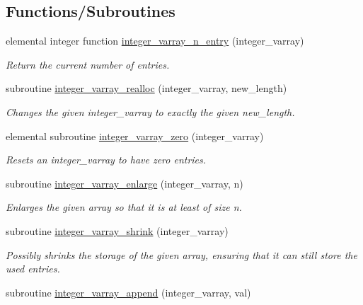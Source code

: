 \subsection*{Functions/\+Subroutines}
\begin{DoxyCompactItemize}
\item 
elemental integer function \mbox{\hyperlink{namespacepmc__integer__varray_aac024cead9772e37f130bdc79254cdd5}{integer\+\_\+varray\+\_\+n\+\_\+entry}} (integer\+\_\+varray)
\begin{DoxyCompactList}\small\item\em Return the current number of entries. \end{DoxyCompactList}\item 
subroutine \mbox{\hyperlink{namespacepmc__integer__varray_a56e39f9ee34a4092a5c32b74b85494bc}{integer\+\_\+varray\+\_\+realloc}} (integer\+\_\+varray, new\+\_\+length)
\begin{DoxyCompactList}\small\item\em Changes the given integer\+\_\+varray to exactly the given new\+\_\+length. \end{DoxyCompactList}\item 
elemental subroutine \mbox{\hyperlink{namespacepmc__integer__varray_a374e54ec508c92316da539cb8f0d8a0f}{integer\+\_\+varray\+\_\+zero}} (integer\+\_\+varray)
\begin{DoxyCompactList}\small\item\em Resets an integer\+\_\+varray to have zero entries. \end{DoxyCompactList}\item 
subroutine \mbox{\hyperlink{namespacepmc__integer__varray_af17a55e72739f42ea30171ba6b236309}{integer\+\_\+varray\+\_\+enlarge}} (integer\+\_\+varray, n)
\begin{DoxyCompactList}\small\item\em Enlarges the given array so that it is at least of size n. \end{DoxyCompactList}\item 
subroutine \mbox{\hyperlink{namespacepmc__integer__varray_a8c78aecfc2429aeca30d230222f69a1e}{integer\+\_\+varray\+\_\+shrink}} (integer\+\_\+varray)
\begin{DoxyCompactList}\small\item\em Possibly shrinks the storage of the given array, ensuring that it can still store the used entries. \end{DoxyCompactList}\item 
subroutine \mbox{\hyperlink{namespacepmc__integer__varray_af69220e955a17e34968b502ba58301e0}{integer\+\_\+varray\+\_\+append}} (integer\+\_\+varray, val)

\end{DoxyCompactItemize}
